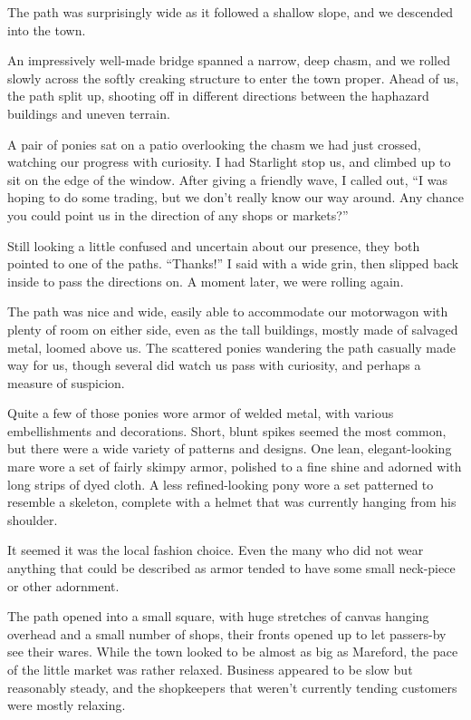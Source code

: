 The path was surprisingly wide as it followed a shallow slope, and we descended into the town.

An impressively well-made bridge spanned a narrow, deep chasm, and we rolled slowly across the softly creaking structure to enter the town proper. Ahead of us, the path split up, shooting off in different directions between the haphazard buildings and uneven terrain.

A pair of ponies sat on a patio overlooking the chasm we had just crossed, watching our progress with curiosity. I had Starlight stop us, and climbed up to sit on the edge of the window. After giving a friendly wave, I called out, “I was hoping to do some trading, but we don’t really know our way around. Any chance you could point us in the direction of any shops or markets?”

Still looking a little confused and uncertain about our presence, they both pointed to one of the paths. “Thanks!” I said with a wide grin, then slipped back inside to pass the directions on. A moment later, we were rolling again.

The path was nice and wide, easily able to accommodate our motorwagon with plenty of room on either side, even as the tall buildings, mostly made of salvaged metal, loomed above us. The scattered ponies wandering the path casually made way for us, though several did watch us pass with curiosity, and perhaps a measure of suspicion.

Quite a few of those ponies wore armor of welded metal, with various embellishments and decorations. Short, blunt spikes seemed the most common, but there were a wide variety of patterns and designs. One lean, elegant-looking mare wore a set of fairly skimpy armor, polished to a fine shine and adorned with long strips of dyed cloth. A less refined-looking pony wore a set patterned to resemble a skeleton, complete with a helmet that was currently hanging from his shoulder.

It seemed it was the local fashion choice. Even the many who did not wear anything that could be described as armor tended to have some small neck-piece or other adornment.

The path opened into a small square, with huge stretches of canvas hanging overhead and a small number of shops, their fronts opened up to let passers-by see their wares. While the town looked to be almost as big as Mareford, the pace of the little market was rather relaxed. Business appeared to be slow but reasonably steady, and the shopkeepers that weren’t currently tending customers were mostly relaxing.

